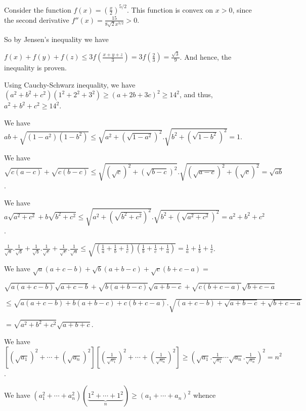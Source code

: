   Consider the function $f(x) = \left(\frac{x}{2}\right)^{5/2}$. This function is convex on $x > 0$, since
  the second derivative $f''(x) = \frac{15}{8\sqrt{2}x^{3/2}}> 0$.

  So by Jensen's inequality we have

  $f(x) + f(y) + f(z)\leq 3f\left(\frac{x + y + z}{3}\right) = 3f\left(\frac{2}{3}\right)
  = \frac{\sqrt{3}}{9}$. And hence, the inequality is proven.
\item Using Cauchy-Schwarz inequality, we have $(a^2 + b^2 + c^2)(1^2 + 2^2 + 3^2)\geq(a + 2b + 3c)^2\geq
  14^2$, and thus, $a^2 + b^2 + c^2\geq 14^2$.
\item We have $ab + \sqrt{(1 - a^2)(1 - b^2)}\leq \sqrt{a^2 + (\sqrt{1 - a^2})^2}.\sqrt{b^2 + (\sqrt{1 -
    b^2})^2} = 1$.
\item We have $\sqrt{c(a - c)} + \sqrt{c(b - c)} \leq \sqrt{(\sqrt{c})^2 + (\sqrt{b - c})^2}.\sqrt{(\sqrt{a
    - c})^2 + (\sqrt{c})^2} = \sqrt{ab}$.
\item We have $a\sqrt{a^2 + c^2} + b\sqrt{b^2 + c^2}\leq \sqrt{a^2 + \left(\sqrt{b^2 +
    c^2}\right)^2}.\sqrt{b^2 + \left(\sqrt{a^2 + c^2}\right)^2} = a^2 + b^2 + c^2$.
\item $\frac{1}{\sqrt{a}}.\frac{1}{\sqrt{b}} + \frac{1}{\sqrt{b}}.\frac{1}{\sqrt{c}}
  + \frac{1}{\sqrt{c}}.\frac{1}{\sqrt{a}}\leq \sqrt{\left(\frac{1}{a} + \frac{1}{b}
    + \frac{1}{c}\right)\left(\frac{1}{b} + \frac{1}{c} + \frac{1}{a}\right)} = \frac{1}{a} + \frac{1}{b}
  + \frac{1}{c}$.
\item We have $\sqrt{a}(a + c - b) + \sqrt{b}(a + b - c) + \sqrt{c}(b + c - a) =$

  $\sqrt{a(a + c - b)}\sqrt{a + c - b} + \sqrt{b(a + b - c)}\sqrt{a + b - c} + \sqrt{c(b + c - a)}\sqrt{b +
  c - a}$

  $\leq \sqrt{a(a + c - b) + b(a  + b - c) + c(b + c - a)}.\sqrt{(a + c - b) + \sqrt{a + b - c} + \sqrt{b +
    c - a}}$

  $= \sqrt{a^2 + b^2 + c^2}\sqrt{a + b + c}$.
\item We have $\left[\left(\sqrt{a_1}\right)^2 + \cdots
  + \left(\sqrt{a_n}\right)^2\right]\left[\left(\frac{1}{\sqrt{a_1}}\right)^2 + \cdots
  + \left(\frac{1}{\sqrt{a_n}}\right)^2\right] \geq \left(\sqrt{a_1}.\frac{1}{\sqrt{a_1}}\cdots \sqrt{a_n}.\frac{1}{\sqrt{a_n}}\right)^2
  = n^2$.
\item We have $(a_1^2 + \cdots + a_n^2)\left(\underbrace{1^2 + \cdots + 1^2}_{n}\right)\geq (a_1 + \cdots +
  a_n)^2$ whence


